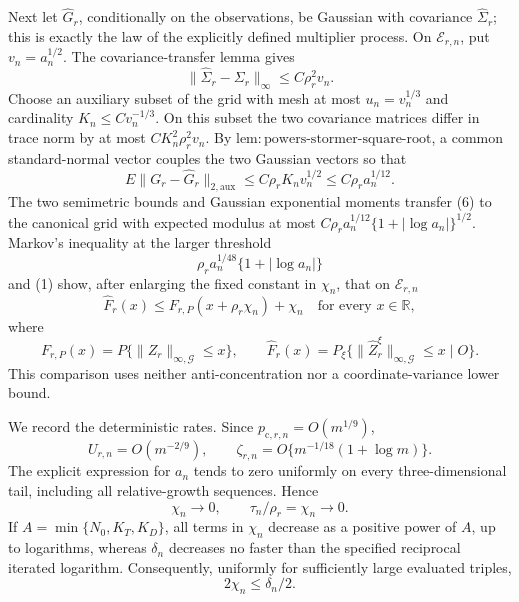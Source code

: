 Next let \(\widehat G_r\), conditionally on the observations, be Gaussian with
covariance \(\widehat\Sigma_r\); this is exactly the law of the explicitly
defined multiplier process.  On \(\mathcal E_{r,n}\), put
\(v_n=a_n^{1/2}\).  The covariance-transfer lemma gives
\[
 \|\widehat\Sigma_r-\Sigma_r\|_\infty
 \le C\rho_r^2v_n.                                      \tag{5}
\]
Choose an auxiliary subset of the grid with mesh at most
\(u_n=v_n^{1/3}\) and cardinality \(K_n\le Cv_n^{-1/3}\).  On this subset
the two covariance matrices differ in trace norm by at most
\(CK_n^2\rho_r^2v_n\).  By
\(\mathrm{lem:powers\mbox{-}stormer\mbox{-}square\mbox{-}root}\), a common
standard-normal vector couples the two Gaussian vectors so that
\[
 E\|G_r-\widehat G_r\|_{2,\mathrm{aux}}
 \le C\rho_rK_nv_n^{1/2}
 \le C\rho_ra_n^{1/12}.                                 \tag{6}
\]
The two semimetric bounds and Gaussian exponential moments transfer (6) to
the canonical grid with expected modulus at most
\(C\rho_ra_n^{1/12}\{1+|\log a_n|\}^{1/2}\).  Markov's inequality at the
larger threshold
\[
 \rho_ra_n^{1/48}\{1+|\log a_n|\}                       \tag{7}
\]
and (1) show, after enlarging the fixed constant in \(\chi_n\), that on
\(\mathcal E_{r,n}\)
\[
 \widehat F_r(x)
 \le F_{r,P}(x+\rho_r\chi_n)+\chi_n
 \quad\text{for every }x\in\mathbb R,                   \tag{8}
\]
where
\[
 F_{r,P}(x)=P\{\|Z_r\|_{\infty,\mathcal G}\le x\},
 \qquad
 \widehat F_r(x)=P_\xi\{\|\widehat Z_r^\xi\|_{\infty,\mathcal G}
 \le x\mid O\}.
\]
This comparison uses neither anti-concentration nor a coordinate-variance
lower bound.

We record the deterministic rates.  Since
\(p_{\mathrm c,r,n}=O(m^{1/9})\),
\[
 U_{r,n}=O(m^{-2/9}),
 \qquad
 \zeta_{r,n}=O\{m^{-1/18}(1+\log m)\}.                  \tag{9}
\]
The explicit expression for \(a_n\) tends to zero uniformly on every
three-dimensional tail, including all relative-growth sequences.  Hence
\[
 \chi_n\longrightarrow0,
 \qquad \tau_n/\rho_r=\chi_n\longrightarrow0.           \tag{10}
\]
If \(A=\min\{N_0,K_T,K_D\}\), all terms in \(\chi_n\) decrease as a positive
power of \(A\), up to logarithms, whereas
\(\delta_n\) decreases no faster than the specified reciprocal iterated
logarithm.  Consequently, uniformly for sufficiently large evaluated
triples,
\[
 2\chi_n\le\delta_n/2.                                   \tag{11}
\]

